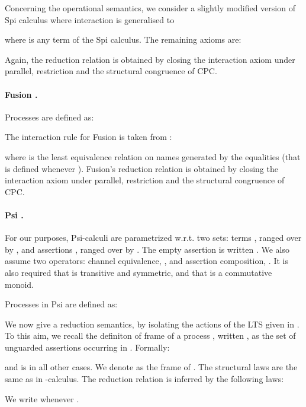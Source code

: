 \documentclass{LMCS}
\begin{document}
Concerning the operational semantics, we
consider a slightly modified version of Spi calculus where
interaction is generalised to

where  is any term of the Spi calculus. The remaining axioms are:

Again, the reduction relation is obtained by closing the interaction axiom
under parallel, restriction and the structural congruence of CPC. 


\paragraph{Fusion \cite{parrow.victor:fusion-calculus}.}
Processes are defined as:

The interaction rule for Fusion is taken from \cite{WG:explicit-fusions}:

where  is the least equivalence relation on names
generated by the equalities  (that is defined 
whenever ).
Fusion's reduction relation is obtained by closing the interaction axiom
under parallel, restriction and the structural congruence of CPC.

\newcommand{\cheq}{\stackrel\cdot\leftrightarrow}
\newcommand{\terms}{{\bf T}}
\newcommand{\assertion}{{\bf A}}
\newcommand{\one}{{\bf 1}}
\newcommand{\compose}{\otimes}
\newcommand{\assert}[1]{\llparenthesis \, #1 \, \rrparenthesis}
\newcommand{\fram}[1]{{\cal F}(#1)}

\paragraph{Psi \cite{BJPV11}.}
For our purposes, Psi-calculi are parametrized w.r.t. two sets: terms ,
ranged over by , and assertions , ranged over by .
The empty assertion is written .
We also assume two operators: channel equivalence, ,
and assertion composition, . 
It is also required that  is transitive and
symmetric, and that  is a commutative monoid.

Processes in Psi are defined as:

We now give a reduction semantics, by isolating the  actions of the
LTS given in \cite{BJPV11}. To this aim, we recall the definiton of frame
of a process , written , as the set of unguarded assertions 
occurring in . Formally:

and is  in all other cases. We denote as  the frame of .
The structural laws are the same as in -calculus.
The reduction relation is inferred by the following laws:

We write  whenever .
\end{document}
